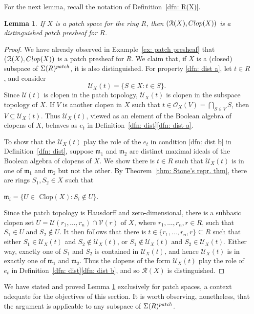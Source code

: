 \documentclass[11pt]{amsart}
\def\m{{\mathfrak m}} %
\def\O{{\mathcal{O}}}
\newtheorem{lemma}[theorem]{Lemma}
\theoremstyle{definition}
\def\cal{\mathcal}
\begin{document}
For the next lemma, recall the notation of Definition~\ref{dfn: R(X)}.


\begin{lemma} \label{lem: distinguished R} If  $X$ is a patch space for the ring $R$, then   $({\cal R}(X),{\rm Clop}(X))$ is a distinguished patch presheaf for $R$.
\end{lemma}

\begin{proof}
We have already observed in Example~\ref{ex: patch presheaf} that $({\cal R}(X), {\rm Clop}(X))$ is a patch presheaf for  $R$. We claim that, if $X$ is a (closed) subspace of ${\Sigma}(R)^{\rm patch}$, it is also distinguished. For property \ref{dfn: dist a}, let $t \in R$,  and consider $${\cal U}_X(t)=\{S \in X:t \in S\}.$$ Since  ${\cal U}(t)$ is clopen in the patch topology, ${\cal U}_X(t)$ is clopen in the subspace topology of $X$. If $V$ is another clopen in $X$ such that $t \in \O_X(V)=\bigcap_{S\in V}S$, then $V \subseteq {\cal U}_X(t)$. Thus  ${\cal U}_X(t)$, viewed as an element of the Boolean algebra of clopens of $X$, behaves as $e_t$ in Definition~\ref{dfn: dist}\ref{dfn: dist a}.

To show that the ${\cal U}_X(t)$ play the role of the $e_t$ in   condition \ref{dfn: dist b} in Definition~\ref{dfn: dist}, suppose $\m_1$ and $\m_2$ are distinct maximal ideals of the Boolean algebra of clopens of $X$. 
We show there is $t \in R$ such that ${\cal U}_X(t)$ is in one of $\m_1$ and $\m_2$ but not the other.
By Theorem~\ref{thm: Stone's repr. thm}, there are rings $S_1,S_2 \in X$ such that 
\begin{center} $\m_i = \{U \in $ Clop$(X):S_i \not \in U\}.$
\end{center}
Since the patch topology is Hausdorff and zero-dimensional, there is a subbasic clopen set $U={\cal U}(r_1,\ldots,r_n) \cap {\cal V}(r)$ of $X$, where $r_1,\ldots,r_n,r\in R$, such that $S_1\in U$ and $S_2\notin U$.  It then follows that there is $t \in \{r_1,\ldots,r_n,r\}\subseteq R$ such that either $S_1 \in {\mathcal{U}}_X(t)$ and $S_2 \not \in {\mathcal{U}}_X(t)$, or 
$S_1 \not \in {\cal U}_X(t)$ and $S_2  \in  {\cal U}_X(t)$.
Either way, exactly one of $S_1$ and $S_2$ is contained in ${\cal U}_X(t)$, and hence ${\cal U}_X(t)$ is in exactly one of $\m_1$ and $\m_2$. Thus the clopens of the form ${\cal U}_X(t) $ play the role of $e_t$ in Definition~\ref{dfn: dist}\ref{dfn: dist b}, and so ${\cal R}(X)$ is distinguished.
\end{proof}

We have stated and proved Lemma \ref{lem: distinguished R} exclusively for patch spaces, a context adequate for the objectives of this section. It is worth observing, nonetheless, that the argument is applicable to any subspace of ${\Sigma}(R)^{\rm patch}$.
\end{document}

